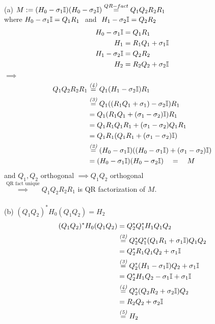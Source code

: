 \begin{SolutionSheet}[\ref{sheet5}]
  \begin{Solution} (a) \Claim $M := (H_0 - \sigma_1 \mathbb{I})(H_0 - \sigma_2 \mathbb{I}) \stackrel{QR-fact}{=} Q_1Q_2R_2R_1$ \\
     where $H_0 - \sigma_1 \mathbb{I} = Q_1R_1 \ $ and $ \ H_1 - \sigma_2 \mathbb{I} = Q_2R_2$ \\
    \Proof \begin{align}
      H_0 - \sigma_1 \mathbb{I} &= Q_1R_1 \\
      H_1 &= R_1Q_1 + \sigma_1 \mathbb{I} \\
      H_1 - \sigma_2 \mathbb{I} &= Q_2R_2 \\
      H_2 &= R_2Q_2 + \sigma_2 \mathbb{I}
    \end{align}
    $\implies$ \begin{align*}
      Q_1Q_2R_2R_1 &\stackrel{\textit{(4)}}{=} Q_1(H_1 - \sigma_2 \mathbb{I})R_1 \\
      &\stackrel{\textit{(3)}}{=} Q_1((R_1Q_1 + \sigma_1) - \sigma_2 \mathbb{I})R_1 \\
      &= Q_1(R_1Q_1 + (\sigma_1 - \sigma_2) \mathbb{I})R_1 \\
      &= Q_1R_1Q_1R_1 + (\sigma_1 - \sigma_2)Q_1R_1 \\
      &= Q_1R_1(Q_1R_1 + (\sigma_1 - \sigma_2)\mathbb{I}) \\
      &\stackrel{\textit{(2)}}{=} (H_0 - \sigma_1 \mathbb{I})((H_0 - \sigma_1 \mathbb{I}) + (\sigma_1 - \sigma_2)\mathbb{I}) \\
      &= (H_0 - \sigma_1 \mathbb{I})(H_0 - \sigma_2 \mathbb{I}) \quad = \quad M 
    \end{align*}
    and $Q_1, Q_2$ orthogonal $\implies Q_1Q_2$ orthogonal\\
    $\stackrel{\text{QR fact unique}}{\implies} Q_1Q_2R_2R_1$ is QR factorization of $M$. \\
    \\
    (b) \Claim $(Q_1Q_2)^* H_0 (Q_1Q_2) = H_2$ \\
    \Proof \begin{align*}
      (Q_1Q_2)^* H_0 (Q_1Q_2) &= Q_2^* Q_1^* H_1 Q_1Q_2 \\
      &\stackrel{\textit{(2)}}{=} Q_2^*Q_1^*(Q_1R_1 + \sigma_1 \mathbb{I})Q_1Q_2 \\
      &= Q_2^*R_1Q_1Q_2 + \sigma_1 \mathbb{I} \\
      & \stackrel{\textit{(3)}}{=} Q_2^*(H_1 - \sigma_1 \mathbb{I})Q_2 + \sigma_1 \mathbb{I} \\
      &= Q_2^*H_1Q_2 - \sigma_1 \mathbb{I} + \sigma_1 \mathbb{I} \\
      & \stackrel{\textit{(4)}}{=} Q_2^* (Q_2R_2 + \sigma_2 \mathbb{I})Q_2 \\
      &= R_2Q_2 + \sigma_2 \mathbb{I} \\
      & \stackrel{\textit{(5)}}{=} H_2
    \end{align*}
  \end{Solution}

  \begin{Solution}[Programming]
  \end{Solution}

\end{SolutionSheet}


